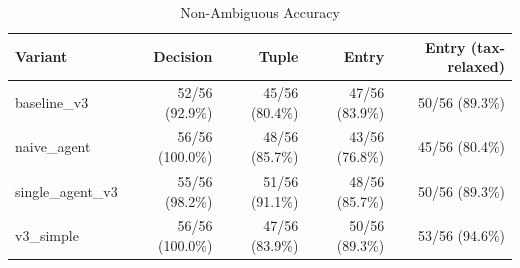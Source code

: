 \begin{table}[htbp]
\centering
\caption{Non-Ambiguous Accuracy}
\label{tab:acc-non-ambig}
\begin{tabular}{l rrrr}
\toprule
Variant & Decision & Tuple & Entry & Entry (tax-relaxed) \\
\midrule
  baseline\_v3 & 52/56 (92.9\%) & 45/56 (80.4\%) & 47/56 (83.9\%) & 50/56 (89.3\%) \\
  naive\_agent & 56/56 (100.0\%) & 48/56 (85.7\%) & 43/56 (76.8\%) & 45/56 (80.4\%) \\
  single\_agent\_v3 & 55/56 (98.2\%) & 51/56 (91.1\%) & 48/56 (85.7\%) & 50/56 (89.3\%) \\
  v3\_simple & 56/56 (100.0\%) & 47/56 (83.9\%) & 50/56 (89.3\%) & 53/56 (94.6\%) \\
\bottomrule
\end{tabular}
\end{table}
